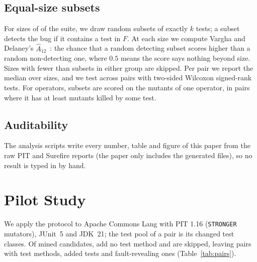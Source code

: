 \documentclass[conference]{IEEEtran}
\begin{document}
\subsection{Equal-size subsets}\label{sec:subsets}
For sizes of \SubsetSizes{} of the suite, we draw \SubsetDraws{} random subsets of exactly $k$ tests; a subset
detects the bug if it contains a test in $F$. At each size we compute Vargha and Delaney's
$\hat{A}_{12}$~\cite{vargha2000critique}: the chance that a random detecting subset scores higher than a random
non-detecting one, where $0.5$ means the score says nothing beyond size. Sizes with fewer than
\MinGroupSubsets{} subsets in either group are skipped. Per pair we report the median over sizes, and we test
across pairs with two-sided Wilcoxon signed-rank tests. For operators, subsets are scored on the mutants of one
operator, in pairs where it has at least \MinKillable{} mutants killed by some test.

\subsection{Auditability}
The analysis scripts write every number, table and figure of this paper from the raw PIT and Surefire reports
(the paper only includes the generated files), so no result is typed in by hand.

\section{Pilot Study}\label{sec:pilot}
We apply the protocol to Apache Commons Lang with PIT 1.16 (\texttt{STRONGER} mutators), JUnit~5 and JDK~21;
the test pool of a pair is its changed test classes. Of \CandidatesMined{} mined candidates,
\CandidatesSkipped{} add no test method and are skipped, leaving \PitfallPairs{} pairs with \TotalTests{} test
methods, \TotalAdded{} added tests and \TotalFaultRevealing{} fault-revealing ones (Table~\ref{tab:pairs}).

\begin{table}[t]
\caption{Pilot pairs. Tests: test methods of the changed test classes; Added (rev.): added test methods
(fault-revealing among them); $\Delta$MS: naive gain in percentage points; $p_{\mathrm{pl}}$: share of placebo
draws with at least that gain; $\hat{A}_{12}$: median over subset sizes for mutation score and coverage.}
\label{tab:pairs}
\centering
\resizebox{\columnwidth}{!}{}
\end{table}
\end{document}
